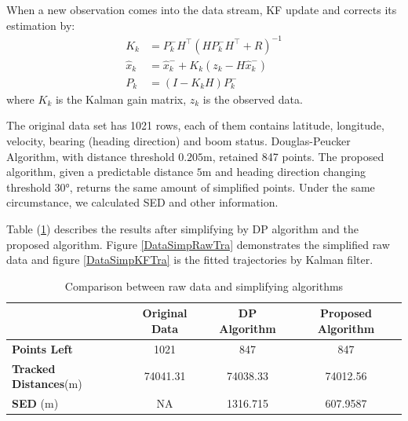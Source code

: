 When a new observation comes into the data stream, KF update and corrects its estimation by: 
\begin{align*}
K_k&=P_k^-H^\top (HP_k^-H^\top+R)^{-1} \\
\hat{x}_k&=\hat{x}_k^-+K_k(z_k-H\hat{x}_k^-) \\
P_k&=(I-K_kH)P_k^-
\end{align*}
where $K_k$ is the Kalman gain matrix, $z_k$ is the observed data.


The original data set has 1021 rows, each of them contains latitude, longitude, velocity, bearing (heading direction) and boom status. Douglas-Peucker Algorithm, with distance threshold $0.205$m, retained 847 points. The proposed algorithm, given a predictable distance $5$m and heading direction changing threshold $\ang{30}$, returns the same amount of simplified points. Under the same circumstance, we calculated SED and other information. 

Table (\ref{DataSimpCompTable}) describes the results after simplifying by DP algorithm and the proposed algorithm. Figure \ref{DataSimpRawTra} demonstrates the simplified raw data and figure \ref{DataSimpKFTra} is the fitted trajectories by Kalman filter. 

\begin{table}
\centering
\caption{Comparison between raw data and simplifying algorithms}
\label{DataSimpCompTable}
\begin{tabular}{|l|c|c|c|}
\hline 
  & \textbf{Original Data} & \textbf{DP Algorithm} & \textbf{Proposed Algorithm}  \\
\hline 
\textbf{Points Left} & 1021              & 847         & 847         \\
\textbf{Tracked Distances}(m)  & 74041.31     & 74038.33    & 74012.56     \\
\textbf{SED} (m)    & NA        & 1316.715    & 607.9587   \\
\hline 
\end{tabular}
\end{table}


